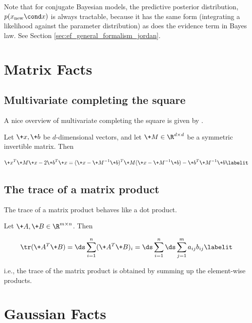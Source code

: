 \documentclass{article} %
\begin{document}
Note that for conjugate Bayesian models, the predictive posterior distribution, $p(x_{\text{new}} \cond x)$ is always tractable, because it has the same form (integrating a likelihood against the parameter distribution) as does the evidence term in Bayes law.   See Section \ref{sec:ef_general_formalism_jordan}.

\newpage 
 \appendix
 

\section{Matrix Facts}

\subsection{Multivariate completing the square}

A nice overview of multivariate completing the square is given by \cite{gundersenXXXXcompleting}.    

Let $\+x,  \+b$ be $d$-dimensional vectors, and let $\+M \in \R^{d \times d}$ be a symmetric invertible matrix. Then

\begin{align*}
\+x^T \+M \+x - 2 \+b^T \+x = (\+x - \+M^{-1} \+b)^T \+M (\+x - \+M^{-1} \+b) - \+b^T \+M^{-1} \+b
 \labelit \label{eqn:multivariate_completing_the_square}
\end{align*}

% 

\subsection{The trace of a matrix product}

The trace of a matrix product behaves like a dot product.  

Let $\+A, \+B \in \R^{m \times n}$.  Then 

\begin{align*}
\tr (\+A^T \+B) = \ds\sum_{i=1}^n (\+A^T \+B)_i = \ds\sum_{i=1}^n \ds\sum_{j=1}^m a_{ij} b_{ij}
\labelit \label{eqn:trace_of_matrix_product}
\end{align*}

i.e.,  the trace of the matrix product is obtained by summing up the element-wise products. 


\section{Gaussian Facts}
\end{document}
